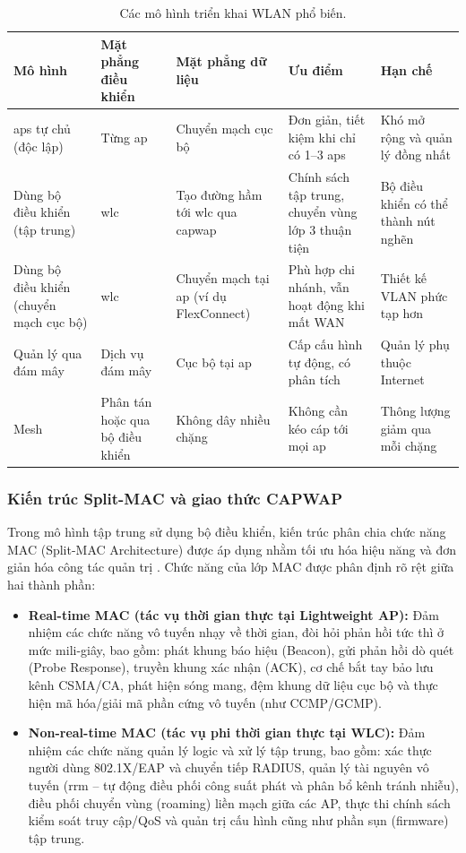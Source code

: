 \begin{table}[htbp]
  \centering\footnotesize
  \caption{Các mô hình triển khai WLAN phổ biến.}
  \label{tab:deployment-models}
  \begin{tabularx}{\linewidth}{@{} L{0.8} L{0.8} L{0.8} L{1.3} L{1.3} @{}}
    \toprule
    \textbf{Mô hình} & \textbf{Mặt phẳng điều khiển} & \textbf{Mặt phẳng dữ liệu} & \textbf{Ưu điểm} & \textbf{Hạn chế} \\
    \midrule
    \acp{ap} tự chủ (độc lập) & Từng \ac{ap} & Chuyển mạch cục bộ & Đơn giản, tiết kiệm khi chỉ có 1--3 \acp{ap} & Khó mở rộng và quản lý đồng nhất \\
    Dùng bộ điều khiển (tập trung) & \acs{wlc} & Tạo đường hầm tới \acs{wlc} qua \acs{capwap} & Chính sách tập trung, chuyển vùng lớp 3 thuận tiện & Bộ điều khiển có thể thành nút nghẽn \\
    Dùng bộ điều khiển (chuyển mạch cục bộ) & \acs{wlc} & Chuyển mạch tại \ac{ap} (ví dụ FlexConnect) & Phù hợp chi nhánh, vẫn hoạt động khi mất WAN & Thiết kế VLAN phức tạp hơn \\
    Quản lý qua đám mây & Dịch vụ đám mây & Cục bộ tại \ac{ap} & Cấp cấu hình tự động, có phân tích & Quản lý phụ thuộc Internet \\
    Mesh & Phân tán hoặc qua bộ điều khiển & Không dây nhiều chặng & Không cần kéo cáp tới mọi \ac{ap} & Thông lượng giảm qua mỗi chặng \\
    \bottomrule
  \end{tabularx}
\end{table}

\subsubsection{Kiến trúc Split-MAC và giao thức CAPWAP}

Trong mô hình tập trung sử dụng bộ điều khiển, kiến trúc phân chia chức năng MAC (Split-MAC Architecture) được áp dụng nhằm tối ưu hóa hiệu năng và đơn giản hóa công tác quản trị \cite{coleman2021, rfc5416}. Chức năng của lớp MAC được phân định rõ rệt giữa hai thành phần:
\begin{itemize}
  \item \textbf{Real-time MAC (tác vụ thời gian thực tại Lightweight AP):} Đảm nhiệm các chức năng vô tuyến nhạy về thời gian, đòi hỏi phản hồi tức thì ở mức mili-giây, bao gồm: phát khung báo hiệu (Beacon), gửi phản hồi dò quét (Probe Response), truyền khung xác nhận (ACK), cơ chế bắt tay bảo lưu kênh CSMA/CA, phát hiện sóng mang, đệm khung dữ liệu cục bộ và thực hiện mã hóa/giải mã phần cứng vô tuyến (như CCMP/GCMP).
  \item \textbf{Non-real-time MAC (tác vụ phi thời gian thực tại WLC):} Đảm nhiệm các chức năng quản lý logic và xử lý tập trung, bao gồm: xác thực người dùng 802.1X/EAP và chuyển tiếp RADIUS, quản lý tài nguyên vô tuyến (\ac{rrm} -- tự động điều phối công suất phát và phân bổ kênh tránh nhiễu), điều phối chuyển vùng (roaming) liền mạch giữa các AP, thực thi chính sách kiểm soát truy cập/QoS và quản trị cấu hình cũng như phần sụn (firmware) tập trung.
\end{itemize}

